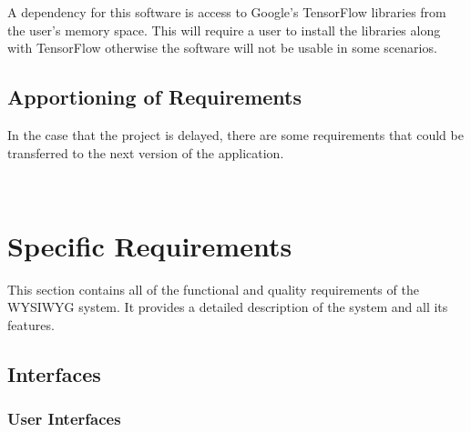 \documentclass[journal,10pt,onecolumn,compsoc]{IEEEtran} \usepackage[margin=1.0in]{geometry} \usepackage{pdfpages} \usepackage{graphicx}
\begin{document}
A dependency for this software is access to Google's TensorFlow libraries from the user's memory space. 
This will require a user to install the libraries along with TensorFlow otherwise the software will not be usable in some scenarios.

\subsection{Apportioning of Requirements}

In the case that the project is delayed, there are some requirements that could be transferred to the next version of the application. 

\begin{minipage}{\textwidth}
		\\
	\end{minipage}


\newpage

\section{Specific Requirements}

This section contains all of the functional and quality requirements of the WYSIWYG system. 
It provides a detailed description of the system and all its features.


\subsection{Interfaces}
\subsubsection{User Interfaces}
\end{document}
